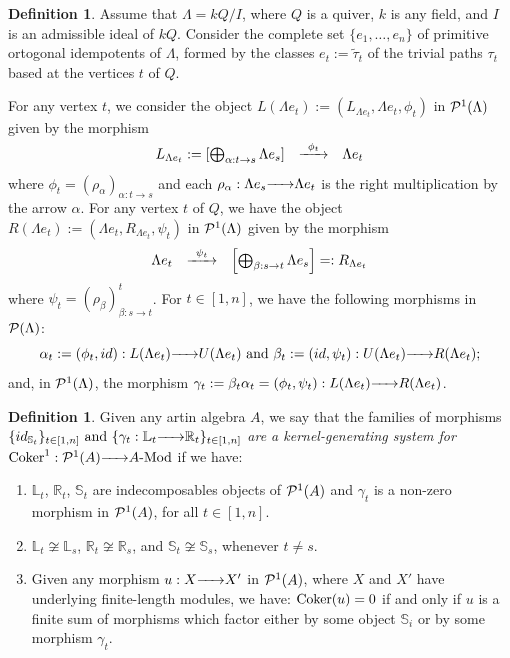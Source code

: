 \documentclass{article}
\theoremstyle{definition}
\newtheorem{definition}[theorem]{Definition}
\newcommand{\Coker}{{ \rm Coker }}
\newcommand{\Mod}{{ \rm Mod }}
\newcommand{\g}{\hbox{-}}
\newcommand{\hueca}[1]{\mathbb{#1}}
\newcommand{\rightmap}[1]{\smash{\mathop{\hbox to 
20pt{\rightarrowfill}}\limits^{#1}}}
\begin{document}
\begin{definition}\label{D: L(Lambdaex) R(Lambdaex)} Assume that $\Lambda=kQ/I$,   where $Q$ is a quiver, $k$ is any field, and $I$ is an admissible ideal of $kQ$. Consider the complete set $\{e_1,\ldots,e_n\}$ of primitive ortogonal idempotents of $\Lambda$, formed by the classes $e_t:=\tilde{\tau}_t$ of the trivial paths $\tau_t$ based at the vertices $t$ of $Q$. 
 
For any  vertex $t$, we consider  the object  $L(\Lambda e_t):=(L_{\Lambda e_t},\Lambda e_t, \phi_t)$ in ${\cal P}^1(\Lambda)$ given by the morphism 
$$\begin{matrix}L_{\Lambda e_t}:=\left[\bigoplus_{\alpha:t\rightarrow s }\Lambda e_s\right]&\rightmap{ \ \ \phi_t \ \ }&\Lambda e_t\end{matrix}$$
where $\phi_t=(\rho_\alpha)_{\alpha:t\rightarrow s}$ and each  $\rho_\alpha:\Lambda e_s\rightmap{}\Lambda e_t$
is the right multiplication by the arrow $\alpha$. For any vertex $t$ of $Q$, we have  the object  $R(\Lambda e_t):=(\Lambda e_t,R_{\Lambda e_t},\psi_t)$ in ${\cal P}^1(\Lambda)$ given by the morphism
$$\begin{matrix}\Lambda e_t&\rightmap{ \  \ \psi_t \ \ }&\left[\bigoplus_{\beta:s\rightarrow t} \Lambda e_s\right]=:R_{\Lambda e_t}\end{matrix}$$
where $\psi_t=(\rho_\beta)^t_{\beta:s\rightarrow t}$. 
For $t\in [1,n]$, we have the following morphisms in ${\cal P}(\Lambda)$:  
$$\alpha_t:=(\phi_t,id):L(\Lambda e_t)\rightmap{}U(\Lambda e_t) \hbox{ and }
\beta_t:=(id,\psi_t):U(\Lambda e_t)\rightmap{}R(\Lambda e_t);$$
and, in ${\cal P}^1(\Lambda)$, the morphism 
$\gamma_t:=\beta_t\alpha_t=(\phi_t,\psi_t):L(\Lambda e_t)\rightmap{}R(\Lambda e_t)$. 
\end{definition}



\begin{definition}\label{D: gen system for Coker Cok^1}  Given any artin algebra  $A$, we  say that the families  of morphisms 
$\{id_{\hueca{S}_t}\}_{t\in[1,n]} \hbox{ and } 
\{\gamma_t:\hueca{L}_t\rightmap{}\hueca{R}_t\}_{t\in [1,n]}$
\emph{are a kernel-generating system for $\Coker^1:{\cal P}^1(A)\rightmap{}A\g\Mod$} if we have:
 \begin{enumerate}
\item  $\hueca{L}_t$, $\hueca{R}_t$, $\hueca{S}_t$ are indecomposables objects of ${\cal P}^1(A)$ and $\gamma_t$ is a non-zero morphism in ${\cal P}^1(A)$, for all $t\in [1,n]$. 
\item $\hueca{L}_t\not\cong \hueca{L}_s$, $\hueca{R}_t\not\cong \hueca{R}_s$, and $\hueca{S}_t\not\cong \hueca{S}_s$, whenever $t\not=s$.
\item Given any morphism $u:X\rightmap{}X'$ in ${\cal P}^1(A)$, where $X$ and $X'$ have underlying finite-length  modules, we have: $\Coker(u)=0$ if and only if $u$ is a finite sum of morphisms which factor either by some object $\hueca{S}_i$ or by some morphism $\gamma_t$.  
\end{enumerate}
\end{definition}
\end{document}
